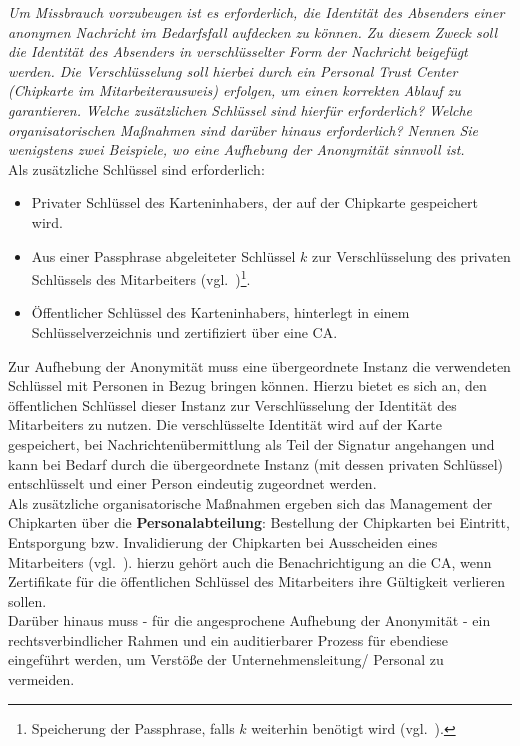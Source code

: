 \textit{Um Missbrauch vorzubeugen ist es erforderlich, die Identität des Absenders einer
anonymen Nachricht im Bedarfsfall aufdecken zu können. Zu diesem Zweck soll
die Identität des Absenders in verschlüsselter Form der Nachricht beigefügt
werden. Die Verschlüsselung soll hierbei durch ein Personal Trust Center (Chipkarte im Mitarbeiterausweis) erfolgen, um einen korrekten Ablauf zu garantieren.
Welche zusätzlichen Schlüssel sind hierfür erforderlich? Welche organisatorischen
Maßnahmen sind darüber hinaus erforderlich? Nennen Sie wenigstens zwei
Beispiele, wo eine Aufhebung der Anonymität sinnvoll ist.}\\


\noindent
Als zusätzliche Schlüssel sind erforderlich:

\begin{itemize}
    \itemsep0.5em
    \item Privater Schlüssel des Karteninhabers, der auf der Chipkarte gespeichert wird.
    \item Aus einer Passphrase abgeleiteter Schlüssel $k$ zur Verschlüsselung des privaten Schlüssels des Mitarbeiters (vgl.~\cite[14]{ITS6})\footnote{
    Speicherung der Passphrase, falls $k$ weiterhin benötigt wird (vgl.~\cite[15]{ITS6}).
    }.
    \item Öffentlicher Schlüssel des Karteninhabers, hinterlegt in einem Schlüsselverzeichnis und zertifiziert über eine CA.
\end{itemize}

\noindent
Zur Aufhebung der Anonymität muss eine übergeordnete Instanz die verwendeten Schlüssel mit Personen in Bezug bringen können.
Hierzu bietet es sich an, den öffentlichen Schlüssel dieser Instanz zur Verschlüsselung der Identität des Mitarbeiters zu nutzen.
Die verschlüsselte Identität wird auf der Karte gespeichert, bei Nachrichtenübermittlung als Teil der Signatur angehangen und kann bei Bedarf durch die übergeordnete Instanz (mit dessen privaten Schlüssel) entschlüsselt und einer Person eindeutig zugeordnet werden.\\

\noindent
Als zusätzliche organisatorische Maßnahmen ergeben sich das Management der Chipkarten über die \textbf{Personalabteilung}: Bestellung der Chipkarten bei Eintritt, Entsporgung bzw. Invalidierung der Chipkarten bei Ausscheiden eines Mitarbeiters (vgl.~\cite[18]{ITS6}). hierzu gehört auch die Benachrichtigung an die CA, wenn Zertifikate für die öffentlichen Schlüssel des Mitarbeiters ihre Gültigkeit verlieren sollen.\\
Darüber hinaus muss - für die angesprochene Aufhebung der Anonymität - ein rechtsverbindlicher Rahmen und ein auditierbarer Prozess für ebendiese eingeführt werden, um Verstöße der Unternehmensleitung/ Personal zu vermeiden.\\

